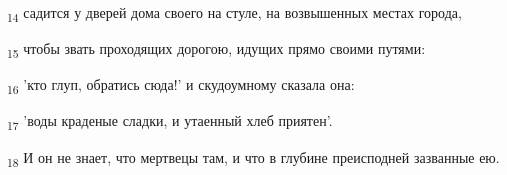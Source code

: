 \begin{tcolorbox}
\textsubscript{14} садится у дверей дома своего на стуле, на возвышенных местах города,
\end{tcolorbox}
\begin{tcolorbox}
\textsubscript{15} чтобы звать проходящих дорогою, идущих прямо своими путями:
\end{tcolorbox}
\begin{tcolorbox}
\textsubscript{16} 'кто глуп, обратись сюда!' и скудоумному сказала она:
\end{tcolorbox}
\begin{tcolorbox}
\textsubscript{17} 'воды краденые сладки, и утаенный хлеб приятен'.
\end{tcolorbox}
\begin{tcolorbox}
\textsubscript{18} И он не знает, что мертвецы там, и что в глубине преисподней зазванные ею.
\end{tcolorbox}
